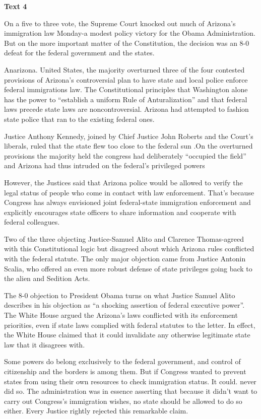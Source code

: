 \begin{center}\textbf{Text 4}\end{center}

On a five to three vote, the Supreme Court knocked out much of Arizona's immigration law Monday-a modest policy victory for the Obama Administration. But on the more important matter of the Constitution, the decision was an 8-0 defeat for the federal government and the states.

Anarizona. United States, the majority overturned three of the four contested provisions of Arizona's controversial plan to have state and local police enforce federal immigrations law. The Constitutional principles that Washington alone has the power to ``establish a uniform Rule of Anturalization'' and that federal laws precede state laws are noncontroversial. Arizona had attempted to fashion state police that ran to the existing federal ones.

Justice Anthony Kennedy, joined by Chief Justice John Roberts and the Court's liberals, ruled that the state flew too close to the federal sun .On the overturned provisions the majority held the congress had deliberately ``occupied the field'' and Arizona had thus intruded on the federal's privileged powers

However, the Justices said that Arizona police would be allowed to verify the legal status of people who come in contact with law enforcement. That’s because Congress has always envisioned joint federal-state immigration enforcement and explicitly encourages state officers to share information and cooperate with federal colleagues.

Two of the three objecting Justice-Samuel Alito and Clarence Thomas-agreed with this Constitutional logic but disagreed about which Arizona rules conflicted with the federal statute. The only major objection came from Justice Antonin Scalia, who offered an even more robust defense of state privileges going back to the alien and Sedition Acts.

The 8-0 objection to President Obama turns on what Justice Samuel Alito describes in his objection as “a shocking assertion of federal executive power”. The White House argued the Arizona’s laws conflicted with its enforcement priorities, even if state laws complied with federal statutes to the letter. In effect, the White House claimed that it could invalidate any otherwise legitimate state law that it disagrees with.

Some powers do belong exclusively to the federal government, and control of citizenship and the borders is among them. But if Congress wanted to prevent states from using their own resources to check immigration status. It could. never did so. The administration was in essence asserting that because it didn't want to carry out Congress's immigration wishes, no state should be allowed to do so either. Every Justice rightly rejected this remarkable claim.


